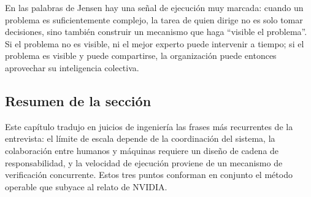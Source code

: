 En las palabras de Jensen hay una señal de ejecución muy marcada: cuando un problema es suficientemente complejo, la tarea de quien dirige no es solo tomar decisiones, sino también construir un mecanismo que haga ``visible el problema''. Si el problema no es visible, ni el mejor experto puede intervenir a tiempo; si el problema es visible y puede compartirse, la organización puede entonces aprovechar su inteligencia colectiva.

\subsection{Resumen de la sección}

Este capítulo tradujo en juicios de ingeniería las frases más recurrentes de la entrevista: el límite de escala depende de la coordinación del sistema, la colaboración entre humanos y máquinas requiere un diseño de cadena de responsabilidad, y la velocidad de ejecución proviene de un mecanismo de verificación concurrente. Estos tres puntos conforman en conjunto el método operable que subyace al relato de NVIDIA.

